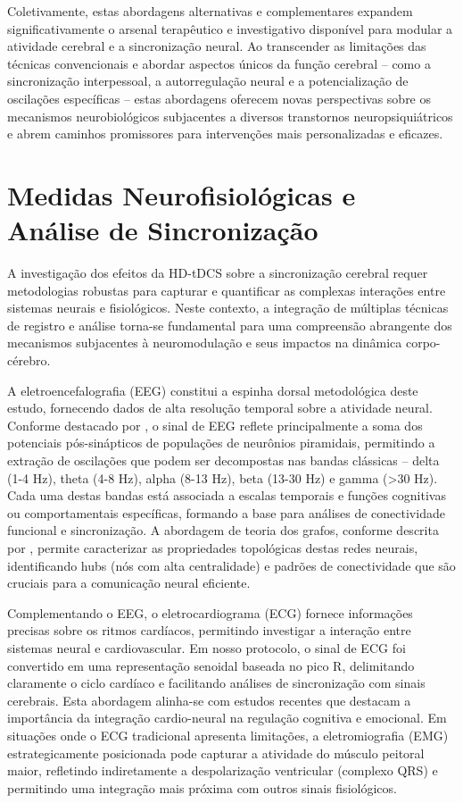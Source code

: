Coletivamente, estas abordagens alternativas e complementares expandem significativamente o arsenal terapêutico e investigativo disponível para modular a atividade cerebral e a sincronização neural. Ao transcender as limitações das técnicas convencionais e abordar aspectos únicos da função cerebral – como a sincronização interpessoal, a autorregulação neural e a potencialização de oscilações específicas – estas abordagens oferecem novas perspectivas sobre os mecanismos neurobiológicos subjacentes a diversos transtornos neuropsiquiátricos e abrem caminhos promissores para intervenções mais personalizadas e eficazes.

\section{Medidas Neurofisiológicas e Análise de Sincronização}
A investigação dos efeitos da HD-tDCS sobre a sincronização cerebral requer metodologias robustas para capturar e quantificar as complexas interações entre sistemas neurais e fisiológicos. Neste contexto, a integração de múltiplas técnicas de registro e análise torna-se fundamental para uma compreensão abrangente dos mecanismos subjacentes à neuromodulação e seus impactos na dinâmica corpo-cérebro.

A eletroencefalografia (EEG) constitui a espinha dorsal metodológica deste estudo, fornecendo dados de alta resolução temporal sobre a atividade neural. Conforme destacado por , o sinal de EEG reflete principalmente a soma dos potenciais pós-sinápticos de populações de neurônios piramidais, permitindo a extração de oscilações que podem ser decompostas nas bandas clássicas – delta (1-4 Hz), theta (4-8 Hz), alpha (8-13 Hz), beta (13-30 Hz) e gamma (>30 Hz). Cada uma destas bandas está associada a escalas temporais e funções cognitivas ou comportamentais específicas, formando a base para análises de conectividade funcional e sincronização. A abordagem de teoria dos grafos, conforme descrita por , permite caracterizar as propriedades topológicas destas redes neurais, identificando hubs (nós com alta centralidade) e padrões de conectividade que são cruciais para a comunicação neural eficiente.

Complementando o EEG, o eletrocardiograma (ECG) fornece informações precisas sobre os ritmos cardíacos, permitindo investigar a interação entre sistemas neural e cardiovascular. Em nosso protocolo, o sinal de ECG foi convertido em uma representação senoidal baseada no pico R, delimitando claramente o ciclo cardíaco e facilitando análises de sincronização com sinais cerebrais. Esta abordagem alinha-se com estudos recentes que destacam a importância da integração cardio-neural na regulação cognitiva e emocional. Em situações onde o ECG tradicional apresenta limitações, a eletromiografia (EMG) estrategicamente posicionada pode capturar a atividade do músculo peitoral maior, refletindo indiretamente a despolarização ventricular (complexo QRS) e permitindo uma integração mais próxima com outros sinais fisiológicos.

